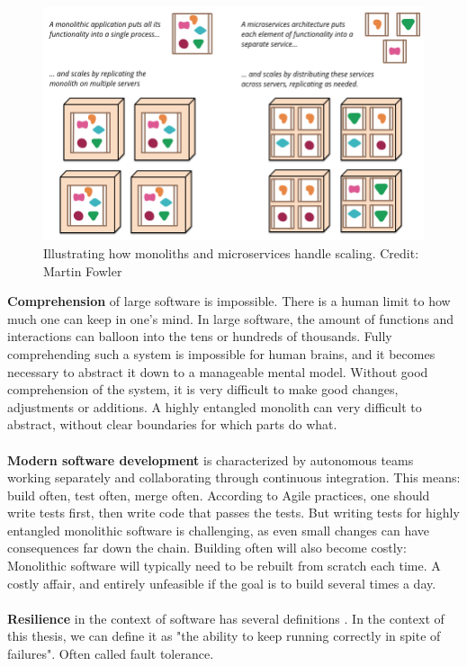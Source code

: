 \begin{figure}[ht] 
\centering 
\includegraphics[width=\columnwidth]{Figures/scaling.png}
\caption{Illustrating how monoliths and microservices handle scaling. Credit: Martin Fowler \cite*{Fowler2014}}
\label{Scaling-comparison}
\end{figure}
\textbf{Comprehension} of large software is impossible. 
There is a human limit to how much one can keep in one's mind. 
In large software, the amount of functions and interactions can balloon into the tens or hundreds of thousands. 
Fully comprehending such a system is impossible for human brains, and it becomes necessary to abstract it down to a manageable mental model. 
Without good comprehension of the system, it is very difficult to make good changes, adjustments or additions.
A highly entangled monolith can very difficult to abstract, without clear boundaries for which parts do what.\\
\\
\textbf{Modern software development} is characterized by autonomous teams working separately and collaborating through continuous integration. 
This means: build often, test often, merge often. 
According to Agile practices, one should write tests first, then write code that passes the tests. 
But writing tests for highly entangled monolithic software is challenging, as even small changes can have consequences far down the chain. 
Building often will also become costly: Monolithic software will typically need to be rebuilt from scratch each time. 
A costly affair, and entirely unfeasible if the goal is to build several times a day. \\
\\
\textbf{Resilience} in the context of software has several definitions \cite*{Curtis}. 
In the context of this thesis, we can define it as "the ability to keep running correctly in spite of failures". Often called fault tolerance.
